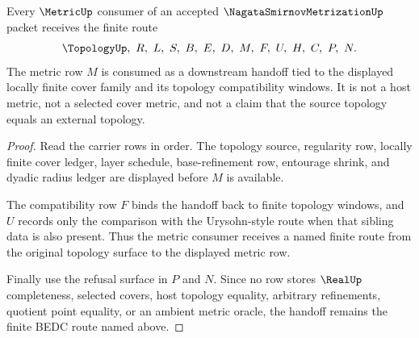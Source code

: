 \begin{theorem}
\label{thm:nagata-smirnov-metrization-metric-handoff}
Every $\MetricUp$ consumer of an accepted $\NagataSmirnovMetrizationUp$ packet receives the finite route
$$
\TopologyUp,\ R,\ L,\ S,\ B,\ E,\ D,\ M,\ F,\ U,\ H,\ C,\ P,\ N .
$$
The metric row $M$ is consumed as a downstream handoff tied to the displayed locally finite cover family and its topology compatibility windows. It is not a host metric, not a selected cover metric, and not a claim that the source topology equals an external topology.
\end{theorem}
\begin{proof}
Read the carrier rows in order. The topology source, regularity row, locally finite cover ledger, layer schedule, base-refinement row, entourage shrink, and dyadic radius ledger are displayed before $M$ is available.

The compatibility row $F$ binds the handoff back to finite topology windows, and $U$ records only the comparison with the Urysohn-style route when that sibling data is also present. Thus the metric consumer receives a named finite route from the original topology surface to the displayed metric row.

Finally use the refusal surface in $P$ and $N$. Since no row stores $\RealUp$ completeness, selected covers, host topology equality, arbitrary refinements, quotient point equality, or an ambient metric oracle, the handoff remains the finite BEDC route named above.
\end{proof}

\begin{closurestatus}{\NagataSmirnovMetrizationUp}
  \theoryclosure{\seedClosure}
  \formalstatus{\formalTargetV}
\end{closurestatus}
